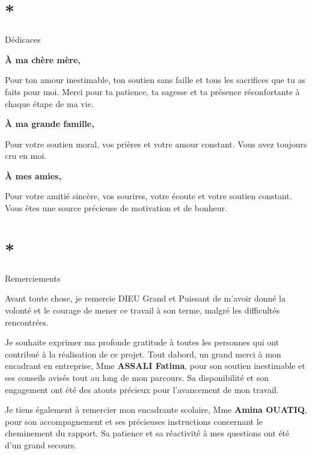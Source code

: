 \documentclass[12pt,a4paper,twoside,openright]{report}
\let\origchapter\chapter
\renewcommand{\chapter}[1]{%
  \cleardoublepage%
  \origchapter{#1}%
}
\begin{document}
\setcounter{page}{1}

\tableofcontents
\thispagestyle{fancy}
\cleardoublepage

\pagestyle{fancy}
\setcounter{page}{1}

\chapter*{Dédicaces}

\textbf{À ma chère mère,}

Pour ton amour inestimable, ton soutien sans faille et tous les
sacrifices que tu as faits pour moi. Merci pour ta patience, ta sagesse
et ta présence réconfortante à chaque étape de ma vie.

\textbf{À ma grande famille,}

Pour votre soutien moral, vos prières et votre amour constant. Vous avez
toujours cru en moi.

\textbf{À mes amies,}

Pour votre amitié sincère, vos sourires, votre écoute et votre soutien
constant. Vous êtes une source précieuse de motivation et de bonheur.

\chapter*{Remerciements}

Avant toute chose, je remercie DIEU Grand et Puissant de m'avoir donné la volonté et le courage de mener ce travail à son terme, malgré les difficultés rencontrées.

Je souhaite exprimer ma profonde gratitude à toutes les personnes qui
ont contribué à la réalisation de ce projet. Tout
d\textquotesingle abord, un grand merci à mon encadrant en entreprise,
Mme \textbf{ASSALI Fatima}, pour son soutien inestimable et ses conseils
avisés tout au long de mon parcours. Sa disponibilité et son engagement
ont été des atouts précieux pour l'avancement de mon travail.

Je tiens également à remercier mon encadrante scolaire, Mme
\textbf{Amina OUATIQ}, pour son accompagnement et ses précieuses
instructions concernant le cheminement du rapport. Sa patience et sa
réactivité à mes questions ont été d'un grand secours.
\end{document}
